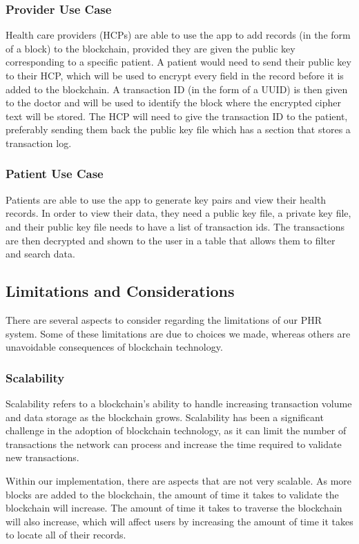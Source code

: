 \documentclass{article}
\begin{document}
\subsubsection{Provider Use Case}
Health care providers (HCPs) are able to use the app to add records (in the form of a block) to the blockchain, provided they are given the public key corresponding to a specific patient. A patient would need to send their public key to their HCP, which will be used to encrypt every field in the record before it is added to the blockchain. A transaction ID (in the form of a UUID) is then given to the doctor and will be used to identify the block where the encrypted cipher text will be stored. The HCP will need to give the transaction ID to the patient, preferably sending them back the public key file which has a section that stores a transaction log.

\subsubsection{Patient Use Case}
Patients are able to use the app to generate key pairs and view their health records. In order to view their data, they need a public key file, a private key file, and their public key file needs to have a list of transaction ids. The transactions are then decrypted and shown to the user in a table that allows them to filter and search data.

\subsection{Limitations and Considerations}

There are several aspects to consider regarding the limitations of our PHR system. Some of these limitations are due to choices we made, whereas others are unavoidable consequences of blockchain technology.

\subsubsection{Scalability}
\label{limitations:scalability}
Scalability refers to a blockchain's ability to handle increasing transaction volume and data storage as the blockchain grows. Scalability has been a significant challenge in the adoption of blockchain technology, as it can limit the number of transactions the network can process and increase the time required to validate new transactions.

Within our implementation, there are aspects that are not very scalable. As more blocks are added to the blockchain, the amount of time it takes to validate the blockchain will increase. The amount of time it takes to traverse the blockchain will also increase, which will affect users by increasing the amount of time it takes to locate all of their records.
\end{document}
